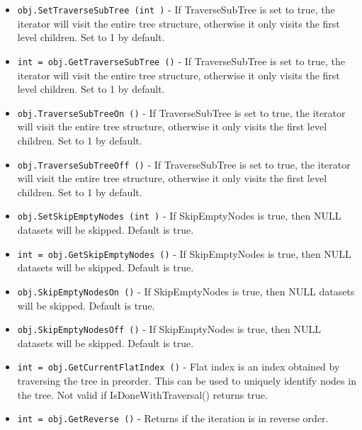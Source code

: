 \begin{itemize}
\item  \verb|obj.SetTraverseSubTree (int )| -  If TraverseSubTree is set to true, the iterator will visit the entire tree
 structure, otherwise it only visits the first level children. Set to 1 by
 default.

\item  \verb|int = obj.GetTraverseSubTree ()| -  If TraverseSubTree is set to true, the iterator will visit the entire tree
 structure, otherwise it only visits the first level children. Set to 1 by
 default.

\item  \verb|obj.TraverseSubTreeOn ()| -  If TraverseSubTree is set to true, the iterator will visit the entire tree
 structure, otherwise it only visits the first level children. Set to 1 by
 default.

\item  \verb|obj.TraverseSubTreeOff ()| -  If TraverseSubTree is set to true, the iterator will visit the entire tree
 structure, otherwise it only visits the first level children. Set to 1 by
 default.

\item  \verb|obj.SetSkipEmptyNodes (int )| -  If SkipEmptyNodes is true, then NULL datasets will be skipped. Default is
 true.

\item  \verb|int = obj.GetSkipEmptyNodes ()| -  If SkipEmptyNodes is true, then NULL datasets will be skipped. Default is
 true.

\item  \verb|obj.SkipEmptyNodesOn ()| -  If SkipEmptyNodes is true, then NULL datasets will be skipped. Default is
 true.

\item  \verb|obj.SkipEmptyNodesOff ()| -  If SkipEmptyNodes is true, then NULL datasets will be skipped. Default is
 true.

\item  \verb|int = obj.GetCurrentFlatIndex ()| -  Flat index is an index obtained by traversing the tree in preorder.
 This can be used to uniquely identify nodes in the tree.
 Not valid if IsDoneWithTraversal() returns true.

\item  \verb|int = obj.GetReverse ()| -  Returns if the iteration is in reverse order.

\end{itemize}
